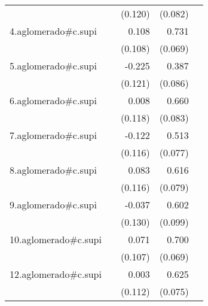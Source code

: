 {\begin{longtable}{l*{4}{D{.}{.}{-1}}}
            &                     &     (0.120)         &     (0.082)         &                     \\
\addlinespace
4.aglomerado#c.supi&                     &       0.108         &       0.731\sym{***}&                     \\
            &                     &     (0.108)         &     (0.069)         &                     \\
\addlinespace
5.aglomerado#c.supi&                     &      -0.225         &       0.387\sym{***}&                     \\
            &                     &     (0.121)         &     (0.086)         &                     \\
\addlinespace
6.aglomerado#c.supi&                     &       0.008         &       0.660\sym{***}&                     \\
            &                     &     (0.118)         &     (0.083)         &                     \\
\addlinespace
7.aglomerado#c.supi&                     &      -0.122         &       0.513\sym{***}&                     \\
            &                     &     (0.116)         &     (0.077)         &                     \\
\addlinespace
8.aglomerado#c.supi&                     &       0.083         &       0.616\sym{***}&                     \\
            &                     &     (0.116)         &     (0.079)         &                     \\
\addlinespace
9.aglomerado#c.supi&                     &      -0.037         &       0.602\sym{***}&                     \\
            &                     &     (0.130)         &     (0.099)         &                     \\
\addlinespace
10.aglomerado#c.supi&                     &       0.071         &       0.700\sym{***}&                     \\
            &                     &     (0.107)         &     (0.069)         &                     \\
\addlinespace
12.aglomerado#c.supi&                     &       0.003         &       0.625\sym{***}&                     \\
            &                     &     (0.112)         &     (0.075)         &                     \\

\end{longtable}}
